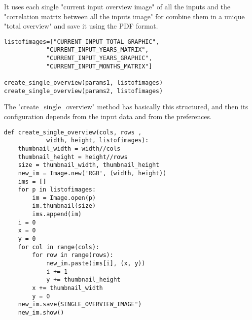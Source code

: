 It uses each single "current input overview image" of all the inputs and the "correlation matrix between all the inputs image" for combine them in a unique "total overview" and save it using the PDF format.

\begin{lstlisting}
listofimages=["CURRENT_INPUT_TOTAL_GRAPHIC",
            "CURRENT_INPUT_YEARS_MATRIX", 
            "CURRENT_INPUT_YEARS_GRAPHIC",
            "CURRENT_INPUT_MONTHS_MATRIX"]
            
create_single_overview(params1, listofimages)
create_single_overview(params2, listofimages)
\end{lstlisting}


The "create\_single\_overview" method has basically this structured, and then its configuration depends from the input data and from the preferences.
\begin{lstlisting}
def create_single_overview(cols, rows ,
			width, height, listofimages):
    thumbnail_width = width//cols
    thumbnail_height = height//rows
    size = thumbnail_width, thumbnail_height
    new_im = Image.new('RGB', (width, height))
    ims = []
    for p in listofimages:
        im = Image.open(p)
        im.thumbnail(size)
        ims.append(im)
    i = 0
    x = 0
    y = 0
    for col in range(cols):
        for row in range(rows):
            new_im.paste(ims[i], (x, y))
            i += 1
            y += thumbnail_height
        x += thumbnail_width
        y = 0
    new_im.save(SINGLE_OVERVIEW_IMAGE")
	new_im.show()
\end{lstlisting}
